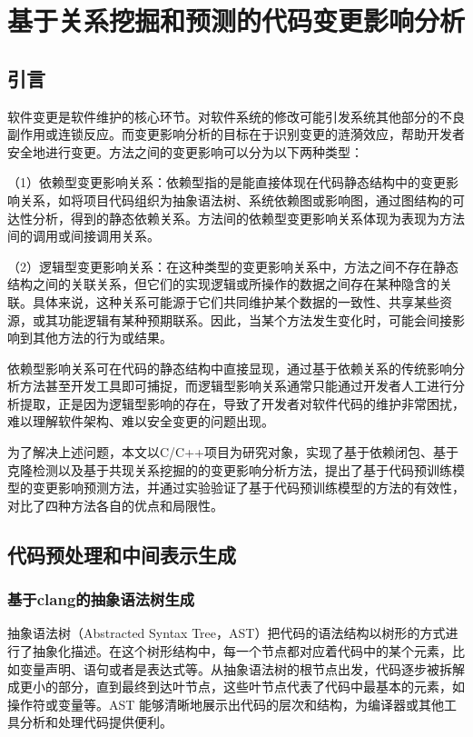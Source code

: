 
\chapter{基于关系挖掘和预测的代码变更影响分析}

\section{引言}

软件变更是软件维护的核心环节。对软件系统的修改可能引发系统其他部分的不良副作用或连锁反应。而变更影响分析的目标在于识别变更的涟漪效应，帮助开发者安全地进行变更。方法之间的变更影响可以分为以下两种类型：

（1）依赖型变更影响关系：依赖型指的是能直接体现在代码静态结构中的变更影响关系，如将项目代码组织为抽象语法树、系统依赖图或影响图，通过图结构的可达性分析，得到的静态依赖关系。方法间的依赖型变更影响关系体现为表现为方法间的调用或间接调用关系。

（2）逻辑型变更影响关系：在这种类型的变更影响关系中，方法之间不存在静态结构之间的关联关系，但它们的实现逻辑或所操作的数据之间存在某种隐含的关联。具体来说，这种关系可能源于它们共同维护某个数据的一致性、共享某些资源，或其功能逻辑有某种预期联系。因此，当某个方法发生变化时，可能会间接影响到其他方法的行为或结果。

依赖型影响关系可在代码的静态结构中直接显现，通过基于依赖关系的传统影响分析方法甚至开发工具即可捕捉，而逻辑型影响关系通常只能通过开发者人工进行分析提取，正是因为逻辑型影响的存在，导致了开发者对软件代码的维护非常困扰，难以理解软件架构、难以安全变更的问题出现。

为了解决上述问题，本文以C/C++项目为研究对象，实现了基于依赖闭包、基于克隆检测以及基于共现关系挖掘的的变更影响分析方法，提出了基于代码预训练模型的变更影响预测方法，并通过实验验证了基于代码预训练模型的方法的有效性，对比了四种方法各自的优点和局限性。


\section{代码预处理和中间表示生成}

\subsection{基于clang的抽象语法树生成}
抽象语法树（Abstracted Syntax Tree，AST）把代码的语法结构以树形的方式进行了抽象化描述。在这个树形结构中，每一个节点都对应着代码中的某个元素，比如变量声明、语句或者是表达式等。从抽象语法树的根节点出发，代码逐步被拆解成更小的部分，直到最终到达叶节点，这些叶节点代表了代码中最基本的元素，如操作符或变量等。AST 能够清晰地展示出代码的层次和结构，为编译器或其他工具分析和处理代码提供便利。



